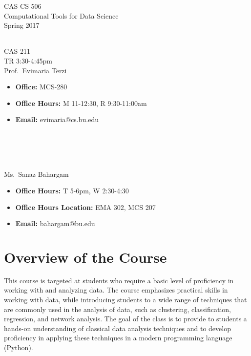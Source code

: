 \documentclass[11pt]{article}
\begin{document}
\sloppy 
\begin{center}
\LARGE CAS CS 506\\
\Large Computational Tools for Data Science\\
\Large\rm Spring 2017\\~\\
\end{center}

 CAS 211\\[\baselineskip]
 TR 3:30-4:45pm
\\[\baselineskip] 

 Prof.\ Evimaria Terzi\\[0.75\baselineskip]
\begin{minipage}[t]{0.60\textwidth}
\begin{itemize}
\item {\bf Office:} MCS-280
\item {\bf Office Hours:} {\small M 11-12:30, R 9:30-11:00am}
\item {\bf Email:} evimaria@cs.bu.edu
\end{itemize}
\end{minipage}
~\\~\\~\\~\\
  Ms.\ Sanaz Bahargam\\[0.75\baselineskip]
 \begin{minipage}[t]{0.60\textwidth}
 \begin{itemize}
 \item {\bf Office Hours:} {\small T 5-6pm, W 2:30-4:30}
 \item {\bf Office Hours Location:} EMA 302, MCS 207
 \item {\bf Email:} bahargam@bu.edu
 \end{itemize}
 \end{minipage}

\section*{Overview of the Course}

This course is targeted at students who require a basic level of
proficiency in working with and analyzing data.  The course emphasizes
practical skills in working with data, while introducing students to a
wide range of techniques that are commonly used in the analysis of data,
such as clustering, classification, regression, and network analysis.
The goal of the class is to provide to students a hands-on understanding
of classical data analysis techniques and to develop proficiency in
applying these techniques in a modern programming language (Python). 
\end{document}
